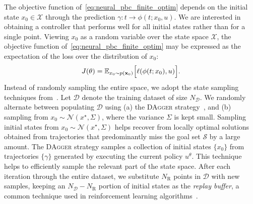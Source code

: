 The objective function of~\eqref{eq:neural_pbc_finite_optim} depends on the
initial state $x_0 \in \mathcal{X}$ through the prediction $\gamma : t \to \phi(t; x_0, u)$.
%
We are interested in obtaining a controller that performs well for
all initial states rather than for a single point. 
%
Viewing $x_0$ as a random variable over the state space $\mathcal{X}$, the
objective function of~\eqref{eq:neural_pbc_finite_optim} may be expressed as the
expectation of the loss over the distribution of $x_0$:
%
\begin{equation}
    J(\theta) = \mathbb{E}_{x_0 \sim p({\bf x}_0)} \Bigl[ \ell(\phi(t;x_0), u) \Bigr].
    \label{eq:loss_expectation}
\end{equation}
%
%
Instead of randomly sampling the entire space, we adopt the state sampling
techniques from~\cite{ross2011no}.
%
Let $\mathcal{D}$ denote the training dataset of size $N_\mathcal{D}$. 
%
We randomly alternate between populating $\mathcal{D}$ using (a) the
\textsc{DAgger} strategy~\cite{ross2011no}, and (b) sampling from $x_0 \sim
\mathcal{N} \left(x^\star, \Sigma\right)$, where the variance $\Sigma$ is kept
small. 
%
Sampling initial states from $x_0 \sim \mathcal{N} \left(x^\star, \Sigma\right)$
helps recover from locally optimal solutions obtained from trajectories that
predominantly miss the goal set $\mathcal{S}$ by a large amount. 
%
The \textsc{DAgger} strategy samples a collection of initial states $\{x_0\}$
from trajectories $\{\gamma\}$ generated by executing the current policy
$u^\theta$.
%
This technique helps to efficiently sample the relevant part of the state space.
%
After each iteration through the entire dataset, we substitute $N_{\textrm{R}}$
points in $\mathcal{D}$ with new samples, keeping an $N_\mathcal{D} -
N_\textrm{R}$ portion of initial states as the \textit{replay buffer}, a common
technique used in reinforcement learning algorithms~\cite{lin1992self}.
%
%
%
%
